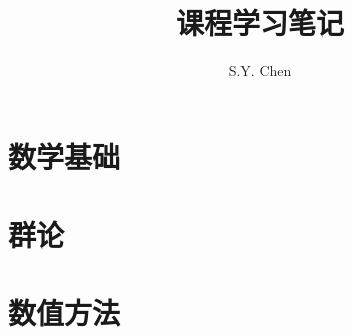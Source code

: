 \documentclass[lang=cn,12pt, scheme=chinese]{elegantbook}
\title{课程学习笔记}
\author{S.Y. Chen}
\begin{document}
\maketitle

\frontmatter
\tableofcontents

\mainmatter

\part{数学基础}


\part{群论}


\part{数值方法}

\end{document}
